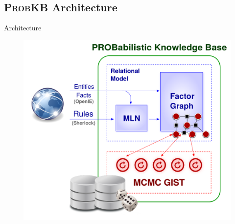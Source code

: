 \documentclass[onlymath,xcolor=pdftex,dvipsnames,table]{beamer}
\newcommand{\probkb}{\textsc{ProbKB}\xspace}
\begin{document}
\subsection{\probkb Architecture}
\begin{frame}{Architecture}
\begin{figure}
  \centering
  \includegraphics[clip,trim=30 0 15 0,width=.7\textwidth]{probkbarch.pdf}
\end{figure}
\end{frame}
\end{document}
